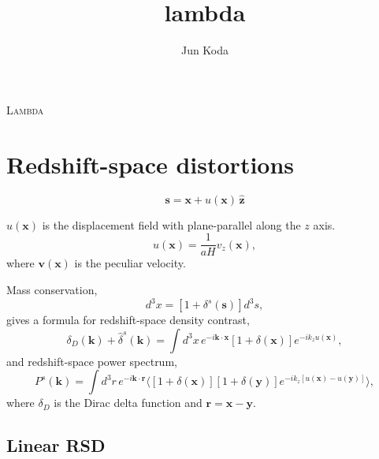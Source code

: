 \documentclass[a4paper,11pt, fleqn]{article}
\title{lambda}
\author{Jun Koda}
\date{}
\begin{document}
%
%
\vspace{0.3 \paperheight}

\begin{center}
  {\Huge \textsc{Lambda}}
\end{center}

\tableofcontents

\sectionfont{\sffamily\Huge\color{Green}\selectfont}
\subsectionfont{\sffamily\color{Green}\selectfont}
\subsubsectionfont{\sffamily\color{Green}\selectfont}
\paragraphfont{\sffamily\color{Green}\selectfont}

%
%
\newpage

\section{Redshift-space distortions}
%
\begin{equation}
  \bm{s} = \bm{x} + u(\bm{x}) \, \hat{\bm{z}}
\end{equation}

$u(\bm{x})$ is the displacement field with plane-parallel along the $z$ axis.
\begin{equation}
  u(\bm{x}) = \frac{1}{aH} v_z(\bm{x}),
\end{equation}
where $\bm{v}(\bm{x})$ is the peculiar velocity.

\vspace{5mm}

Mass conservation,
%
\begin{equation}
  [1 + \delta(\bm{x})] d^3 x = [1 + \delta^s(\bm{s})] d^3 s,
\end{equation}
%
gives a formula for redshift-space density contrast,
%
\begin{equation}
  \label{eq:delta-s}
  \delta_D(\bm{k}) + \hat{\delta}^s(\bm{k})
  = \int \! d^3 x \, e^{-i\bm{k}\cdot\bm{x}} [1 + \delta(\bm{x})]
    e^{-ik_z u(\bm{x})},
\end{equation}
%
and redshift-space power spectrum,
%
\begin{equation}
  P^s(\bm{k}) = \int \! d^3 r \, e^{-i\bm{k}\cdot\bm{r}}
  \Big\langle
      [1 + \delta(\bm{x})][1 + \delta(\bm{y})]
      e^{-ik_z [u(\bm{x}) - u(\bm{y})]}\Big\rangle,
\end{equation}
where $\delta_D$ is the Dirac delta function and $\bm{r} = \bm{x} - \bm{y}$.


\newpage
\subsection{Linear RSD}
\end{document}
